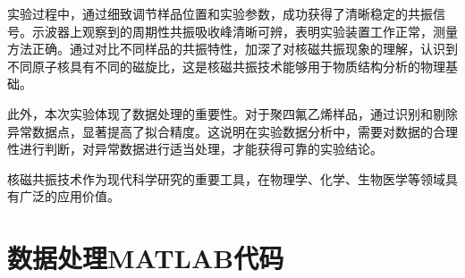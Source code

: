 ﻿\documentclass[12pt,a4paper]{article}
\begin{document}
实验过程中，通过细致调节样品位置和实验参数，成功获得了清晰稳定的共振信号。示波器上观察到的周期性共振吸收峰清晰可辨，表明实验装置工作正常，测量方法正确。通过对比不同样品的共振特性，加深了对核磁共振现象的理解，认识到不同原子核具有不同的磁旋比，这是核磁共振技术能够用于物质结构分析的物理基础。

此外，本次实验体现了数据处理的重要性。对于聚四氟乙烯样品，通过识别和剔除异常数据点，显著提高了拟合精度。这说明在实验数据分析中，需要对数据的合理性进行判断，对异常数据进行适当处理，才能获得可靠的实验结论。

核磁共振技术作为现代科学研究的重要工具，在物理学、化学、生物医学等领域具有广泛的应用价值。

\clearpage
\appendix

\section{数据处理MATLAB代码}
\end{document}

